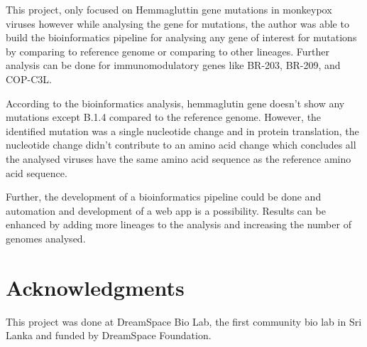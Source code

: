 \documentclass[fleqn,10pt]{olplainarticle}
\begin{document}
This project, only focused on Hemmagluttin gene mutations in monkeypox viruses however while analysing the gene for mutations, the author was able to build the bioinformatics pipeline for analysing any gene of interest for mutations by comparing to reference genome or comparing to other lineages. Further analysis can be done for immunomodulatory genes like BR-203, BR-209, and COP-C3L. 

According to the bioinformatics analysis, hemmaglutin gene doesn’t show any mutations except B.1.4 compared to the reference genome. However, the identified mutation was a single nucleotide change and in protein translation, the nucleotide change didn't contribute to an amino acid change which concludes all the analysed viruses have the same amino acid sequence as the reference amino acid sequence. 

Further, the development of a bioinformatics pipeline could be done and automation and development of a web app is a possibility. Results can be enhanced by adding more lineages to the analysis and increasing the number of genomes analysed. 

\section*{Acknowledgments}

This project was done at DreamSpace Bio Lab, the first community bio lab in Sri Lanka and funded by DreamSpace Foundation.



\end{document}
